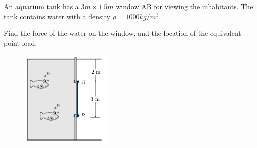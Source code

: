 
An aquarium tank has a $ 3 m \times 1.5 m$ window AB for viewing the inhabitants.  The tank contains water with a density $\rho = 1000 kg/m^3$.

Find the force of the water on the window, and the location of the equivalent point load.

\begin{figure}[ht!]
  \centering
  \includegraphics[width=0.4\textwidth,height=0.5\textheight,keepaspectratio]{fig.png}
\end{figure}

